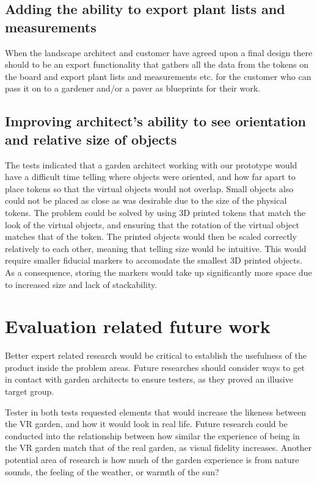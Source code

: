 \subsection*{Adding the ability to export plant lists and measurements}
When the landscape architect and customer have agreed upon a final design there should to be an export functionality that gathers all the data from the tokens on the board and export plant lists and measurements etc. for the customer who can pass it on to a gardener and/or a paver as blueprints for their work.

\subsection*{Improving architect's ability to see orientation and relative size of objects}
The tests indicated that a garden architect working with our prototype would have a difficult time telling where objects were oriented, and how far apart to place tokens so that the virtual objects would not overlap. Small objects also could not be placed as close as was desirable due to the size of the physical tokens. The problem could be solved by using 3D printed tokens that match the look of the virtual objects, and ensuring that the rotation of the virtual object matches that of the token. The printed objects would then be scaled correctly relatively to each other, meaning that telling size would be intuitive. This would require smaller fiducial markers to accomodate the smallest 3D printed objects. As a consequence, storing the markers would take up significantly more space due to increased size and lack of stackability. 

\section{Evaluation related future work}

Better expert related research would be critical to establish the usefulness of the product inside the problem areas. Future researches should consider ways to get in contact with garden architects to ensure testers, as they proved an illusive target group.

Tester in both tests requested elements that would increase the likeness between the VR garden, and how it would look in real life. Future research could be conducted into the relationship between how similar the experience of being in the VR garden match that of the real garden, as visual fidelity increases. Another potential area of research is how much of the garden experience is from nature sounds, the feeling of the weather, or warmth of the sun?
